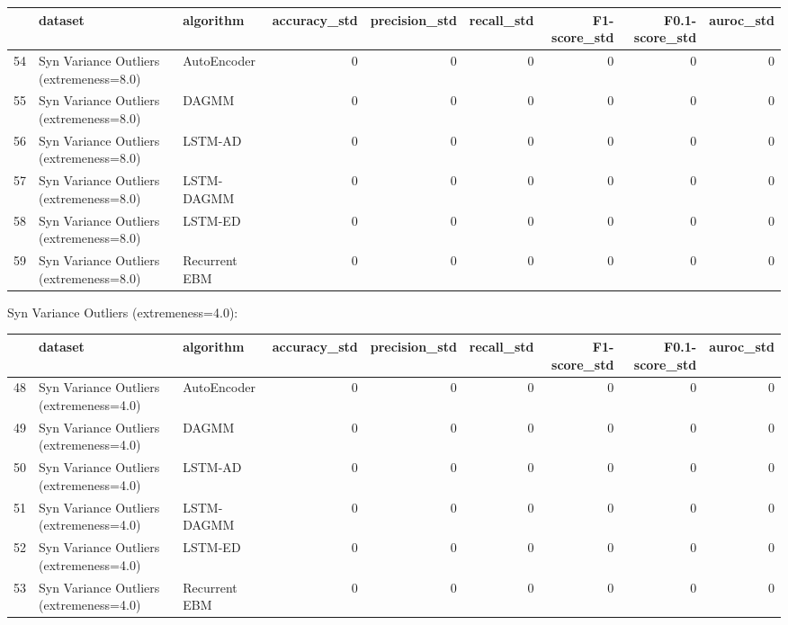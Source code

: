 \begin{tabular}{rllrrrrrr}
\hline
    & dataset                                 & algorithm     &   accuracy\_std &   precision\_std &   recall\_std &   F1-score\_std &   F0.1-score\_std &   auroc\_std \\
\hline
 54 & Syn Variance Outliers (extremeness=8.0) & AutoEncoder   &              0 &               0 &            0 &              0 &                0 &           0 \\
 55 & Syn Variance Outliers (extremeness=8.0) & DAGMM         &              0 &               0 &            0 &              0 &                0 &           0 \\
 56 & Syn Variance Outliers (extremeness=8.0) & LSTM-AD       &              0 &               0 &            0 &              0 &                0 &           0 \\
 57 & Syn Variance Outliers (extremeness=8.0) & LSTM-DAGMM    &              0 &               0 &            0 &              0 &                0 &           0 \\
 58 & Syn Variance Outliers (extremeness=8.0) & LSTM-ED       &              0 &               0 &            0 &              0 &                0 &           0 \\
 59 & Syn Variance Outliers (extremeness=8.0) & Recurrent EBM &              0 &               0 &            0 &              0 &                0 &           0 \\
\hline
\end{tabular}

Syn Variance Outliers (extremeness=4.0):

\begin{tabular}{rllrrrrrr}
\hline
    & dataset                                 & algorithm     &   accuracy\_std &   precision\_std &   recall\_std &   F1-score\_std &   F0.1-score\_std &   auroc\_std \\
\hline
 48 & Syn Variance Outliers (extremeness=4.0) & AutoEncoder   &              0 &               0 &            0 &              0 &                0 &           0 \\
 49 & Syn Variance Outliers (extremeness=4.0) & DAGMM         &              0 &               0 &            0 &              0 &                0 &           0 \\
 50 & Syn Variance Outliers (extremeness=4.0) & LSTM-AD       &              0 &               0 &            0 &              0 &                0 &           0 \\
 51 & Syn Variance Outliers (extremeness=4.0) & LSTM-DAGMM    &              0 &               0 &            0 &              0 &                0 &           0 \\
 52 & Syn Variance Outliers (extremeness=4.0) & LSTM-ED       &              0 &               0 &            0 &              0 &                0 &           0 \\
 53 & Syn Variance Outliers (extremeness=4.0) & Recurrent EBM &              0 &               0 &            0 &              0 &                0 &           0 \\
\hline
\end{tabular}

